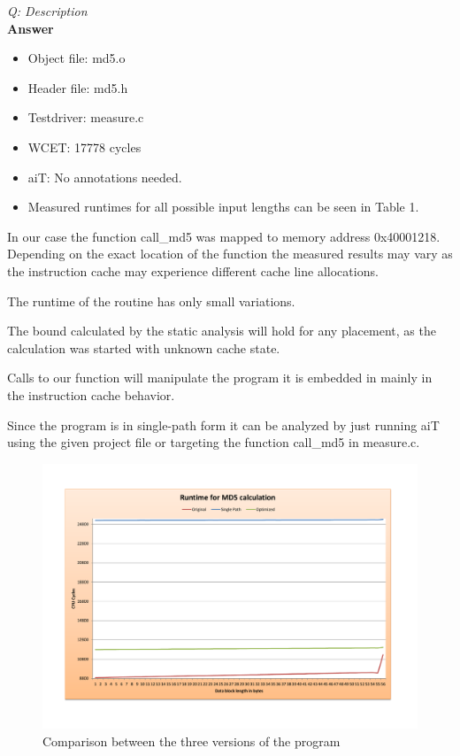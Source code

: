 \documentclass[a4paper,english,12pt,oneside]{article}
\newcommand{\Quest}[2]{
\noindent\emph{Q: #1}\\[0.5cm]
\noindent\textbf{Answer}\\
\noindent #2
\vspace{0.7cm}
}
\begin{document}
\Quest{Description}
{
\begin{itemize}
\item[ ] Object file: md5.o
\item[ ] Header file: md5.h
\item[ ] Testdriver: measure.c
\item[ ] WCET: 17778 cycles
\item[ ] aiT: No annotations needed.
\item[ ] Measured runtimes for all possible input lengths can be seen in Table 1.
\end{itemize}

In our case the function call\_md5 was mapped to memory address 0x40001218.
Depending on the exact location of the function the measured results may vary as the instruction cache may experience different cache line allocations.

The runtime of the routine has only small variations.

The bound calculated by the static analysis will hold for any placement, as the calculation was started with unknown cache state.

Calls to our function will manipulate the program it is embedded in mainly in the instruction cache behavior.

Since the program is in single-path form it can be analyzed by just running aiT using the given project file or targeting the function call\_md5 in measure.c.
}

\begin{landscape}
\begin{figure}
\includegraphics[height=\textwidth]{comparison.pdf}
\caption{Comparison between the three versions of the program}
\label{fig:comp}
\end{figure}
\end{landscape}
\end{document}
